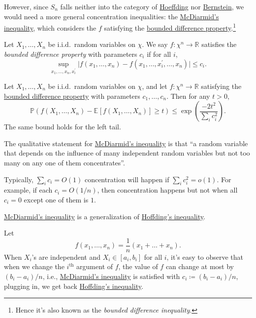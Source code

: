 However, since \(S_n\) falls neither into the category of \hyperref[thm:Hoeffding-inequality]{Hoeffding} nor \hyperref[thm:Bernstein-inequality]{Bernstein}, we would need a more general concentration inequalities: the \hyperref[thm:McDiarmid-inequality]{McDiarmid's inequality}, which considers the \(f\) satisfying the \hyperref[def:bounded-difference-property]{bounded difference property}.\footnote{Hence it's also known as the \emph{bounded difference inequality}.}

\begin{definition}\label{def:bounded-difference-property}
	Let \(X_1, \dots , X_n\) be i.i.d.\ random variables on \(\chi \). We say \(f\colon \chi ^n \to \mathbb{R} \) satisfies the \emph{bounded difference property} with parameters \(c_i\) if for all \(i\),
	\[
		\sup _{x_1, \dots , x_n, x_i^{\prime} }\vert f(x_1, \dots , x_n) - f(x_1, \dots , x_i^{\prime} , \dots , x_n) \vert \leq c_i.
	\]
\end{definition}

\begin{theorem}\label{thm:McDiarmid-inequality}
	Let \(X_1, \dots , X_n\) be i.i.d.\ random variables on \(\chi \), and let \(f\colon \chi ^n \to \mathbb{R} \) satisfying the \hyperref[def:bounded-difference-property]{bounded difference property} with parameters \(c_1, \dots , c_n\). Then for any \(t > 0\),
	\[
		\mathbb{P} (f(X_1, \dots , X_n) - \mathbb{E}_{}\left[f (X_1, \dots , X_n)\right] \geq t) \leq \exp \left( \frac{-2t^2}{\sum_{i} c_i^2} \right).
	\]
	The same bound holds for the left tail.
\end{theorem}

\begin{remark}
	The qualitative statement for \hyperref[thm:McDiarmid-inequality]{McDiarmid's inequality} is that ``a random variable that depends on the influence of many independent random variables but not too many on any one of them concentrates''.
\end{remark}
\begin{explanation}
	Typically, \(\sum_{i} c_i = O(1)\) concentration will happen if \(\sum_{i} c_i^2 = o(1)\). For example, if each \(c_i = O(1 / n)\), then concentration happens but not when all \(c_i = 0\) except one of them is \(1\).
\end{explanation}

\begin{remark}
	\hyperref[thm:McDiarmid-inequality]{McDiarmid's inequality} is a generalization of \hyperref[thm:Hoeffding-inequality]{Hoffding's inequality}.
\end{remark}
\begin{explanation}
	Let
	\[
		f(x_1, \dots , x_n) = \frac{1}{n}(x_1 + \dots + x_n).
	\]
	When \(X_i\)'s are independent and \(X_i \in [a_i, b_i]\) for all \(i\), it's easy to observe that when we change the \(i^{\text{th} }\) argument of \(f\), the value of \(f\) can change at most by \((b_i - a_i) / n\), i.e., \hyperref[thm:McDiarmid-inequality]{McDiarmid's inequality} is satisfied with \(c_i \coloneqq (b_i - a_i) / n\), plugging in, we get back \hyperref[thm:Hoeffding-inequality]{Hoffding's inequality}.
\end{explanation}

